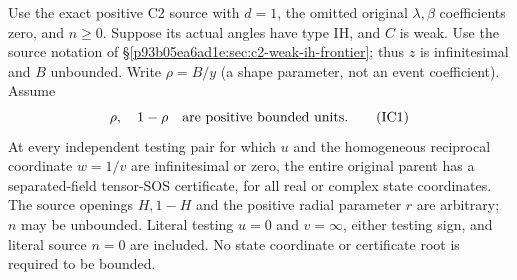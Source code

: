 \begin{theorem}
Use the exact positive C2 source with $d=1$, the omitted original
$\lambda,\beta$ coefficients zero, and $n\ge0$. Suppose its actual
angles have type IH, and $C$ is weak. Use the source notation of
\S\ref{p93b05ea6ad1e:sec:c2-weak-ih-frontier}; thus $z$ is infinitesimal and
$B$ unbounded. Write $\rho=B/y$ (a shape parameter, not an event
coefficient). Assume
\[
 \rho,\quad1-\rho
 \quad\hbox{are positive bounded units}.                 \tag{IC1}
\]
At every independent testing pair for which $u$ and the homogeneous
reciprocal coordinate $w=1/v$ are infinitesimal or zero, the entire
original parent has a separated-field tensor-SOS certificate, for
all real or complex state coordinates. The source openings $H,1-H$ and the positive radial parameter $r$
are arbitrary; $n$ may be unbounded. Literal
testing $u=0$ and $v=\infty$, either testing sign, and literal source
$n=0$ are included.
No state coordinate or certificate root is required to be bounded.
\end{theorem}

